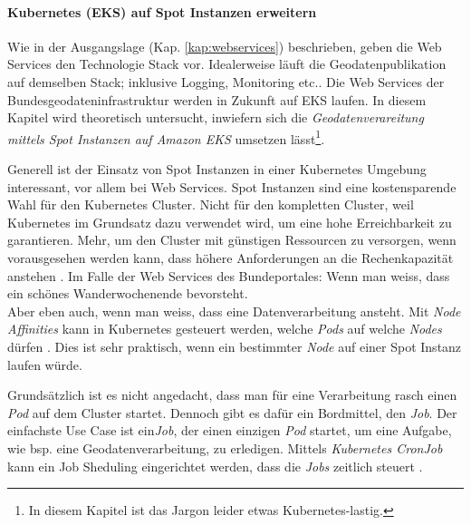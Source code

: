 \paragraph{Kubernetes (EKS) auf Spot Instanzen erweitern}
Wie in der Ausgangslage (Kap. \ref{kap:webservices}) beschrieben, geben die Web Services den Technologie Stack vor. Idealerweise läuft die Geodatenpublikation auf demselben Stack; inklusive Logging, Monitoring etc.. 
Die Web Services der Bundesgeodateninfrastruktur werden in Zukunft auf EKS laufen. In diesem Kapitel wird theoretisch untersucht, inwiefern sich die \textit{Geodatenverareitung mittels Spot Instanzen auf Amazon EKS} umsetzen lässt\footnote{In diesem Kapitel ist das Jargon leider etwas Kubernetes-lastig.}. 

Generell ist der Einsatz von Spot Instanzen in einer Kubernetes Umgebung interessant, vor allem bei Web Services. Spot Instanzen sind eine kostensparende Wahl für den Kubernetes Cluster. Nicht für den kompletten Cluster, weil Kubernetes im Grundsatz dazu verwendet wird, um eine hohe Erreichbarkeit zu garantieren. Mehr, um den Cluster mit günstigen Ressourcen zu versorgen, wenn vorausgesehen werden kann, dass höhere Anforderungen an die Rechenkapazität anstehen \autocite[89]{CloudNativ:1}. Im Falle der Web Services des Bundeportales: Wenn man weiss, dass ein schönes Wanderwochenende bevorsteht.\\Aber eben auch, wenn man weiss, dass eine Datenverarbeitung ansteht.
Mit \emph{Node Affinities} kann in Kubernetes gesteuert werden, welche \emph{Pods} auf welche \emph{Nodes} dürfen \autocite[159]{CloudNativ:1}. Dies ist sehr praktisch, wenn ein bestimmter \emph{Node} auf einer Spot Instanz laufen würde.

Grundsätzlich ist es nicht angedacht, dass man für eine Verarbeitung rasch einen \emph{Pod} auf dem Cluster startet. Dennoch gibt es dafür ein Bordmittel, den \emph{Job}. Der einfachste Use Case ist ein\emph{Job}, der einen einzigen \emph{Pod} startet, um eine Aufgabe, wie bsp. eine Geodatenverarbeitung, zu erledigen. Mittels \emph{Kubernetes CronJob} kann ein Job Sheduling eingerichtet werden, dass die \emph{Jobs} zeitlich steuert \cite{9781788390071}.
